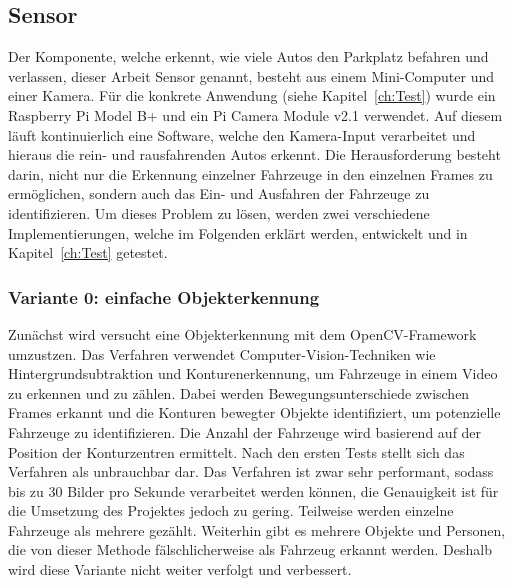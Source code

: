 \subsection{Sensor}\label{ch:Umsetzung_Sensor}

Der Komponente, welche erkennt, wie viele Autos den Parkplatz befahren und verlassen, dieser Arbeit Sensor genannt, besteht aus einem Mini-Computer und einer Kamera.
Für die konkrete Anwendung (siehe Kapitel~\ref{ch:Test}) wurde ein Raspberry Pi Model B+ und ein Pi Camera Module v2.1 verwendet.
Auf diesem läuft kontinuierlich eine Software, welche den Kamera-Input verarbeitet und hieraus die rein- und rausfahrenden Autos erkennt.
Die Herausforderung besteht darin, nicht nur die Erkennung einzelner Fahrzeuge in den einzelnen Frames zu ermöglichen, sondern auch das Ein- und Ausfahren der Fahrzeuge zu identifizieren.
Um dieses Problem zu lösen, werden zwei verschiedene Implementierungen, welche im Folgenden erklärt werden, entwickelt und in Kapitel~\ref{ch:Test} getestet.

\subsubsection{Variante 0: einfache Objekterkennung}\label{ch:Sensor_v0}
Zunächst wird versucht eine Objekterkennung mit dem OpenCV-Framework umzustzen.
Das Verfahren verwendet Computer-Vision-Techniken wie Hintergrundsubtraktion und Konturenerkennung, um Fahrzeuge in einem Video zu erkennen und zu zählen.
Dabei werden Bewegungsunterschiede zwischen Frames erkannt und die Konturen bewegter Objekte identifiziert, um potenzielle Fahrzeuge zu identifizieren.
Die Anzahl der Fahrzeuge wird basierend auf der Position der Konturzentren ermittelt.
Nach den ersten Tests stellt sich das Verfahren als unbrauchbar dar.
Das Verfahren ist zwar sehr performant, sodass bis zu 30 Bilder pro Sekunde verarbeitet werden können, die Genauigkeit ist für die Umsetzung des Projektes jedoch zu gering.
Teilweise werden einzelne Fahrzeuge als mehrere gezählt.
Weiterhin gibt es mehrere Objekte und Personen, die von dieser Methode fälschlicherweise als Fahrzeug erkannt werden.
Deshalb wird diese Variante nicht weiter verfolgt und verbessert.


